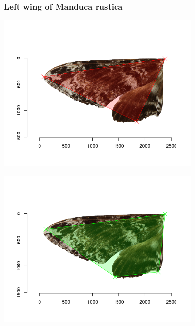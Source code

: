\documentclass[
]{article}
\let\origfigure\figure
\let\endorigfigure\endfigure
\renewenvironment{figure}[1][2] {
    \expandafter\origfigure\expandafter[H]
} {
    \endorigfigure
}
\begin{document}
\hypertarget{left-wing-of-manduca-rustica}{%
\subsubsection{Left wing of Manduca
rustica}\label{left-wing-of-manduca-rustica}}

\begin{figure}
\centering
\includegraphics[width=\textwidth,height=3.125in]{./img/Areas_3_Manduca_rustica_left_wing.png}
\caption{Threangle}
\end{figure}

\begin{figure}
\centering
\includegraphics[width=\textwidth,height=3.125in]{./img/Areas_4_Manduca_rustica_left_wing.png}
\caption{Quadrangle}
\end{figure}
\end{document}
